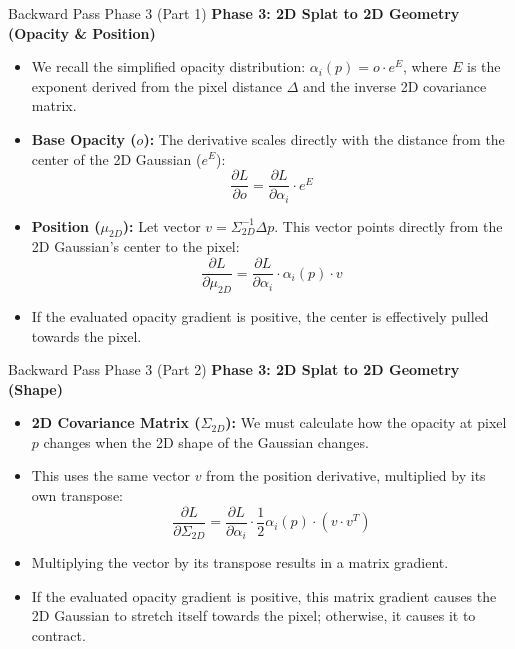 \begin{frame}{Backward Pass Phase 3 (Part 1)}
    \textbf{Phase 3: 2D Splat to 2D Geometry (Opacity \& Position)}
    \begin{itemize}
        \item We recall the simplified opacity distribution: $\alpha_i(p) = o \cdot e^E$, where $E$ is the exponent derived from the pixel distance $\Delta$ and the inverse 2D covariance matrix.
        \item \textbf{Base Opacity ($o$):} The derivative scales directly with the distance from the center of the 2D Gaussian ($e^E$):
        $$ \frac{\partial L}{\partial o} = \frac{\partial L}{\partial \alpha_i} \cdot e^E $$
        \item \textbf{Position ($\mu_{2D}$):} Let vector $v = \Sigma_{2D}^{-1}\Delta p$. This vector points directly from the 2D Gaussian's center to the pixel:
        $$ \frac{\partial L}{\partial \mu_{2D}} = \frac{\partial L}{\partial \alpha_i} \cdot \alpha_i(p) \cdot v $$
        \item If the evaluated opacity gradient is positive, the center is effectively pulled towards the pixel.
    \end{itemize}
\end{frame}

\begin{frame}{Backward Pass Phase 3 (Part 2)}
    \textbf{Phase 3: 2D Splat to 2D Geometry (Shape)}
    \begin{itemize}
        \item \textbf{2D Covariance Matrix ($\Sigma_{2D}$):} We must calculate how the opacity at pixel $p$ changes when the 2D shape of the Gaussian changes.
        \item This uses the same vector $v$ from the position derivative, multiplied by its own transpose:
        $$ \frac{\partial L}{\partial \Sigma_{2D}} = \frac{\partial L}{\partial \alpha_i} \cdot \frac{1}{2} \alpha_i(p) \cdot (v \cdot v^T) $$
        \item Multiplying the vector by its transpose results in a matrix gradient.
        \item If the evaluated opacity gradient is positive, this matrix gradient causes the 2D Gaussian to stretch itself towards the pixel; otherwise, it causes it to contract.
    \end{itemize}
\end{frame}

